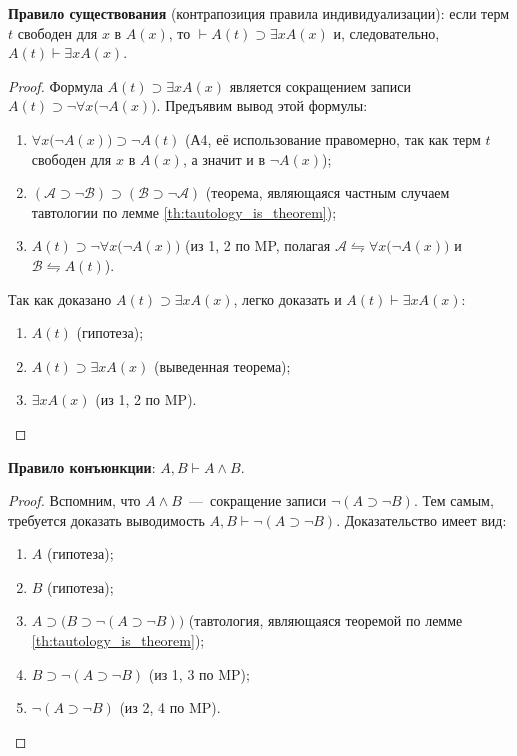 \textbf{Правило существования} (контрапозиция правила индивидуализации): если терм $t$ свободен для $x$ в $A(x)$, то $\vdash A(t) \supset \exists xA(x)$ и, следовательно, $A(t) \vdash \exists xA(x)$.
\begin{proof}
    Формула $A(t) \supset \exists xA(x)$ является сокращением записи $A(t) \supset \neg \forall x\big(\neg A(x)\big)$. Предъявим вывод этой формулы:
    \begin{enumerate}
        \item $\forall x\big(\neg A(x)\big) \supset \neg A(t)$ (А4, её использование правомерно, так как терм $t$ свободен для $x$ в $A(x)$, а значит и в $\neg A(x)$);
        \item $(\mathcal{A} \supset \neg \mathcal{B}) \supset (\mathcal{B} \supset \neg \mathcal{A})$ (теорема, являющаяся частным случаем тавтологии по лемме \ref{th:tautology_is_theorem});
        \item $A(t) \supset \neg\forall x\big(\neg A(x)\big)$ (из 1, 2 по MP, полагая $\mathcal{A} \leftrightharpoons \forall x\big(\neg A(x)\big)$ и $\mathcal{B} \leftrightharpoons A(t)$).
    \end{enumerate}
    Так как доказано $A(t) \supset \exists xA(x)$, легко доказать и $A(t) \vdash \exists xA(x)$:
    \begin{enumerate}
        \item $A(t)$ (гипотеза);
        \item $A(t) \supset \exists xA(x)$ (выведенная теорема);
        \item $\exists xA(x)$ (из 1, 2 по MP).
    \end{enumerate}
\end{proof}

\textbf{Правило конъюнкции}: $A, B \vdash A \land B$.
\begin{proof}Вспомним, что $A \land B$~---~сокращение записи $\neg(A \supset \neg B)$. Тем самым, требуется доказать выводимость $A, B \vdash \neg(A \supset \neg B)$. Доказательство имеет вид:
    \begin{enumerate}
        \item $A$ (гипотеза);
        \item $B$ (гипотеза);
        \item $A \supset \big(B \supset \neg(A \supset \neg B)\big)$ (тавтология, являющаяся теоремой по лемме \ref{th:tautology_is_theorem});
        \item $B \supset \neg(A \supset \neg B)$ (из 1, 3 по MP);
        \item $\neg(A \supset \neg B)$ (из 2, 4 по MP).
    \end{enumerate}
\end{proof}

